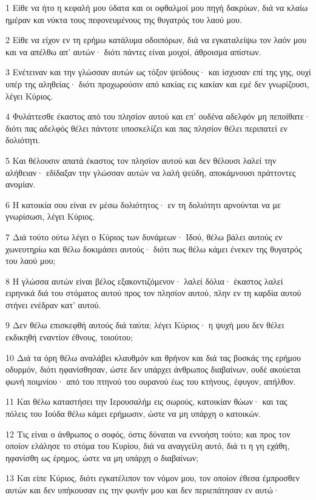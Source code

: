 \par 1 Είθε να ήτο η κεφαλή μου ύδατα και οι οφθαλμοί μου πηγή δακρύων, διά να κλαίω ημέραν και νύκτα τους πεφονευμένους της θυγατρός του λαού μου.
\par 2 Είθε να είχον εν τη ερήμω κατάλυμα οδοιπόρων, διά να εγκαταλείψω τον λαόν μου και να απέλθω απ' αυτών· διότι πάντες είναι μοιχοί, άθροισμα απίστων.
\par 3 Ενέτειναν και την γλώσσαν αυτών ως τόξον ψεύδους· και ίσχυσαν επί της γης, ουχί υπέρ της αληθείας· διότι προχωρούσιν από κακίας εις κακίαν και εμέ δεν γνωρίζουσι, λέγει Κύριος.
\par 4 Φυλάττεσθε έκαστος από του πλησίον αυτού και επ' ουδένα αδελφόν μη πεποίθατε· διότι πας αδελφός θέλει πάντοτε υποσκελίζει και πας πλησίον θέλει περιπατεί εν δολιότητι.
\par 5 Και θέλουσιν απατά έκαστος τον πλησίον αυτού και δεν θέλουσι λαλεί την αλήθειαν· εδίδαξαν την γλώσσαν αυτών να λαλή ψεύδη, αποκάμνουσι πράττοντες ανομίαν.
\par 6 Η κατοικία σου είναι εν μέσω δολιότητος· εν τη δολιότητι αρνούνται να με γνωρίσωσι, λέγει Κύριος.
\par 7 Διά τούτο ούτω λέγει ο Κύριος των δυνάμεων· Ιδού, θέλω βάλει αυτούς εν χωνευτηρίω και θέλω δοκιμάσει αυτούς· διότι πως θέλω κάμει ένεκεν της θυγατρός του λαού μου;
\par 8 Η γλώσσα αυτών είναι βέλος εξακοντιζόμενον· λαλεί δόλια· έκαστος λαλεί ειρηνικά διά του στόματος αυτού προς τον πλησίον αυτού, πλην εν τη καρδία αυτού στήνει ενέδραν κατ' αυτού.
\par 9 Δεν θέλω επισκεφθή αυτούς διά ταύτα; λέγει Κύριος· η ψυχή μου δεν θέλει εκδικηθή εναντίον έθνους, τοιούτου;
\par 10 Διά τα όρη θέλω αναλάβει κλαυθμόν και θρήνον και διά τας βοσκάς της ερήμου οδυρμόν, διότι ηφανίσθησαν, ώστε δεν υπάρχει άνθρωπος διαβαίνων, ουδέ ακούεται φωνή ποιμνίου· από του πτηνού του ουρανού έως του κτήνους, έφυγον, απήλθον.
\par 11 Και θέλω καταστήσει την Ιερουσαλήμ εις σωρούς, κατοικίαν θώων· και τας πόλεις του Ιούδα θέλω κάμει ερήμωσιν, ώστε να μη υπάρχη ο κατοικών.
\par 12 Τις είναι ο άνθρωπος ο σοφός, όστις δύναται να εννοήση τούτο; και προς τον οποίον ελάλησε το στόμα του Κυρίου, διά να αναγγείλη αυτό, διά τι η γη εχάθη, ηφανίσθη ως έρημος, ώστε να μη υπάρχη ο διαβαίνων;
\par 13 Και είπε Κύριος, διότι εγκατέλιπον τον νόμον μου, τον οποίον έθεσα έμπροσθεν αυτών και δεν υπήκουσαν εις την φωνήν μου και δεν περιεπάτησαν εν αυτώ·
